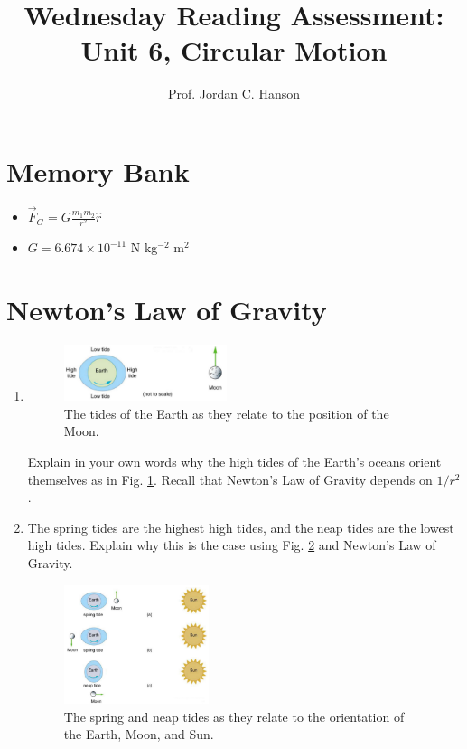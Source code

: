 \documentclass{article}
\begin{document}
\title{Wednesday Reading Assessment: Unit 6, Circular Motion}
\author{Prof. Jordan C. Hanson}

\maketitle

\section{Memory Bank}

\begin{itemize}
\item $\vec{F}_G = G \frac{m_1 m_2}{r^2} \hat{r}$
\item $G = 6.674 \times 10^{-11}$ N kg$^{-2}$ m$^2$
\end{itemize}

\section{Newton's Law of Gravity}

\begin{enumerate}
\item
\begin{figure}[ht]
\centering
\includegraphics[width=0.45\textwidth]{tide1.png}
\caption{\label{fig:tide1} The tides of the Earth as they relate to the position of the Moon.}
\end{figure}
Explain in your own words why the high tides of the Earth's oceans orient themselves as in Fig. \ref{fig:tide1}.  Recall that Newton's Law of Gravity depends on $1/r^2$.  \\ \vspace{2cm}
\item The spring tides are the highest high tides, and the neap tides are the lowest high tides.  Explain why this is the case using Fig. \ref{fig:tide2} and Newton's Law of Gravity.
\begin{figure}[hb]
\centering
\includegraphics[width=0.4\textwidth]{tide2.png}
\caption{\label{fig:tide2} The spring and neap tides as they relate to the orientation of the Earth, Moon, and Sun.}
\end{figure}
\end{enumerate}
\end{document}
